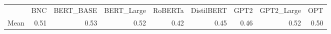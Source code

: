 \begin{tabular}{lrrrrrrrr}
 & BNC & BERT_BASE & BERT_Large & RoBERTa & DistilBERT & GPT2 & GPT2_Large & OPT \\
Mean & 0.51 & 0.53 & 0.52 & 0.42 & 0.45 & 0.46 & 0.52 & 0.50 \\
\end{tabular}
